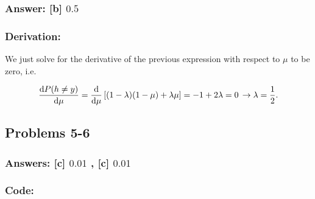 \documentclass[11pt]{article}
\begin{document}
\hypertarget{answer-b-0.5}{%
\subsubsection{\texorpdfstring{Answer: {[}b{]}
\(0.5\)}{Answer: {[}b{]} 0.5}}\label{answer-b-0.5}}

\hypertarget{derivation}{%
\subsubsection{Derivation:}\label{derivation}}

We just solve for the derivative of the previous expression with respect
to \(\mu\) to be zero, i.e.

\[
\frac{{\rm d}P(h\neq y)}{{\rm d}\mu} = \frac{{\rm d}}{{\rm d}\mu}\left[(1-\lambda)(1-\mu)+\lambda\mu\right]=-1+2\lambda=0\,\rightarrow \lambda=\frac
{1}{2}.
\]

    \hypertarget{problems-5-6}{%
\subsection{Problems 5-6}\label{problems-5-6}}

\hypertarget{answers-c-0.01-c-0.01}{%
\subsubsection{\texorpdfstring{Answers: {[}c{]} \(0.01\) , {[}c{]}
\(0.01\)}{Answers: {[}c{]} 0.01 , {[}c{]} 0.01}}\label{answers-c-0.01-c-0.01}}

\hypertarget{code}{%
\subsubsection{Code:}\label{code}}
\end{document}
